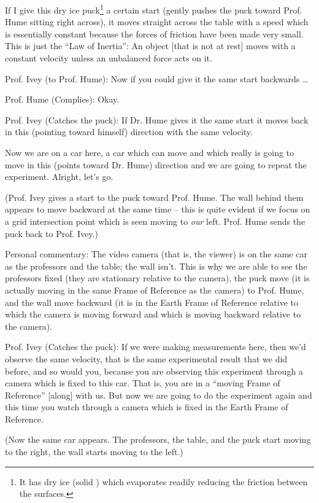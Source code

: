 \documentclass[a6paper]{article}
\newcommand{\perscom}[1]{
    {\footnotesize Personal commentary:  #1}
}
\begin{document}
If I give this dry ice puck\footnote{It has dry ice (solid ) which evaporates readily reducing the friction between the surfaces.} a certain start (gently pushes the puck toward Prof. Hume sitting right across), it moves straight across the table with a speed which is essentially constant because the forces of friction have been made very small. This is just the ``Law of Inertia'': An object [that is not at rest] moves with a constant velocity unless an unbalanced force acts on it. 

Prof. Ivey (to Prof. Hume): Now if you could give it the same start backwards \dots

Prof. Hume (Complies): Okay.

Prof. Ivey (Catches the puck): If Dr. Hume gives it the same start it moves back in this (pointing toward himself) direction with the same velocity.

Now we are on a car here, a car which can move and which really is going to move in this (points toward Dr. Hume) direction and we are going to repeat the experiment. Alright, let's go.  

(Prof. Ivey gives a start to the puck toward Prof. Hume. The wall behind them appears to move backward at the same time -- this is quite evident if we focus on a grid intersection point which is seen moving to \emph{our} left. Prof. Hume sends the puck back to Prof. Ivey.)

\perscom{ The video camera (that is, the viewer) is on the same car as the professors and the table; the wall isn't. This is why we are able to see the professors fixed (they are stationary relative to the camera), the puck move (it is actually moving in the same Frame of Reference as the camera) to Prof. Hume, and the wall move backward (it is in the Earth Frame of Reference relative to which the camera is moving forward and which is moving backward relative to the camera). }

Prof. Ivey (Catches the puck): If we were making measurements here, then we'd observe the same velocity, that is the same experimental result that we did before, and so would you, because you are observing this experiment through a camera which is fixed to this car. That is, you are in a ``moving Frame of Reference'' [along] with us. But now we are going to do the experiment again and this time you watch through a camera which is fixed in the Earth Frame of Reference.

(Now the same car appears. The professors, the table, and the puck start moving to the right, the wall starts moving to the left.)
\end{document}
